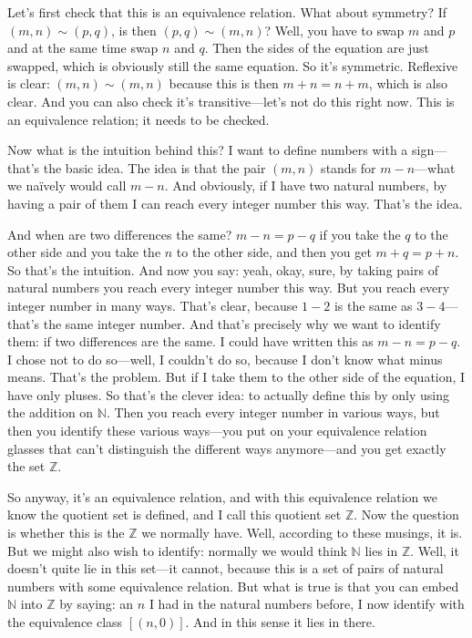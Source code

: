Let's first check that this is an equivalence relation. What about symmetry? If $(m, n) \sim (p, q)$, is then $(p, q) \sim (m, n)$? Well, you have to swap $m$ and $p$ and at the same time swap $n$ and $q$. Then the sides of the equation are just swapped, which is obviously still the same equation. So it's symmetric. Reflexive is clear: $(m, n) \sim (m, n)$ because this is then $m + n = n + m$, which is also clear. And you can also check it's transitive---let's not do this right now. This is an equivalence relation; it needs to be checked.

Now what is the intuition behind this? I want to define numbers with a sign---that's the basic idea. The idea is that the pair $(m, n)$ stands for $m - n$---what we na\"ively would call $m - n$. And obviously, if I have two natural numbers, by having a pair of them I can reach every integer number this way. That's the idea.

And when are two differences the same? $m - n = p - q$ if you take the $q$ to the other side and you take the $n$ to the other side, and then you get $m + q = p + n$. So that's the intuition. And now you say: yeah, okay, sure, by taking pairs of natural numbers you reach every integer number this way. But you reach every integer number in many ways. That's clear, because $1 - 2$ is the same as $3 - 4$---that's the same integer number. And that's precisely why we want to identify them: if two differences are the same. I could have written this as $m - n = p - q$. I chose not to do so---well, I couldn't do so, because I don't know what minus means. That's the problem. But if I take them to the other side of the equation, I have only pluses. So that's the clever idea: to actually define this by only using the addition on $\mathbb{N}$. Then you reach every integer number in various ways, but then you identify these various ways---you put on your equivalence relation glasses that can't distinguish the different ways anymore---and you get exactly the set $\mathbb{Z}$.

So anyway, it's an equivalence relation, and with this equivalence relation we know the quotient set is defined, and I call this quotient set $\mathbb{Z}$. Now the question is whether this is the $\mathbb{Z}$ we normally have. Well, according to these musings, it is. But we might also wish to identify: normally we would think $\mathbb{N}$ lies in $\mathbb{Z}$. Well, it doesn't quite lie in this set---it cannot, because this is a set of pairs of natural numbers with some equivalence relation. But what is true is that you can embed $\mathbb{N}$ into $\mathbb{Z}$ by saying: an $n$ I had in the natural numbers before, I now identify with the equivalence class $[(n, 0)]$. And in this sense it lies in there.

